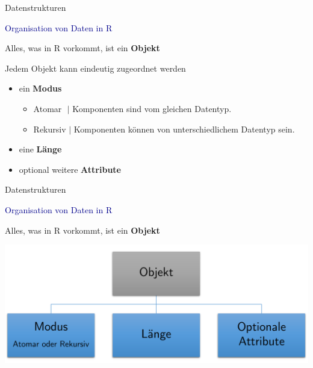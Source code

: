 \documentclass[
  8pt,
  ignorenonframetext,
]{beamer}
\providecommand{\tightlist}{%
  \setlength{\itemsep}{0pt}\setlength{\parskip}{0pt}}
\begin{document}
\begin{frame}{Datenstrukturen}
\protect\hypertarget{datenstrukturen-2}{}

\textcolor{darkblue}{Organisation von Daten in R} \vspace{1mm}

Alles, was in R vorkommt, ist ein \textbf{Objekt} \vspace{1mm}

Jedem Objekt kann eindeutig zugeordnet werden

\begin{itemize}
\item
  ein \textbf{Modus}

  \begin{itemize}
  \tightlist
  \item
    Atomar \(\,\,\vert\) Komponenten sind vom gleichen Datentyp.
  \item
    Rekursiv \(\vert\) Komponenten können von unterschiedlichem Datentyp
    sein.
  \end{itemize}
\item
  eine \textbf{Länge}
\item
  optional weitere \textbf{Attribute}
\end{itemize}
\end{frame}

\begin{frame}{Datenstrukturen}
\protect\hypertarget{datenstrukturen-3}{}

\textcolor{darkblue}{Organisation von Daten in R} \vspace{1mm}

Alles, was in R vorkommt, ist ein \textbf{Objekt} \vspace{5mm}

\begin{center}\includegraphics[width=0.8\linewidth]{2_Abbildungen/pds_2_r_objektstruktur} \end{center}
\end{frame}
\end{document}
